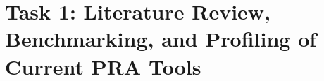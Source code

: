 \section{Task 1: Literature Review, Benchmarking, and Profiling of Current PRA Tools}
\label{sec:task1}

% 


% 

